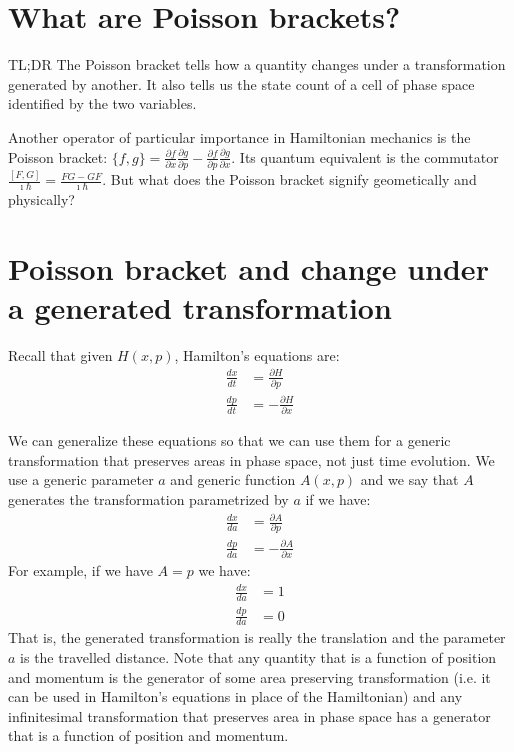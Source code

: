 \documentclass[aps,pra,10pt,floatfix,nofootinbib]{revtex4-1}
\theoremstyle{definition}
\begin{document}
\section{What are Poisson brackets?}

TL;DR The Poisson bracket tells how a quantity changes under a transformation generated by another. It also tells us the state count of a cell of phase space identified by the two variables.

Another operator of particular importance in Hamiltonian mechanics is the Poisson bracket: $\{f,g\}=\frac{\partial f}{\partial x}\frac{\partial g}{\partial p} - \frac{\partial f}{\partial p} \frac{\partial g}{\partial x}$. Its quantum equivalent is the commutator $\frac{[F, G]}{\imath \hbar} = \frac{FG - GF}{\imath \hbar}$. But what does the Poisson bracket signify geometically and physically?

\section{Poisson bracket and change under a generated transformation}

Recall that given $H(x,p)$, Hamilton's equations are:
\begin{equation}
\begin{aligned}
\frac{dx}{dt} &= \frac{\partial H}{\partial p}  \\
\frac{dp}{dt} &= - \frac{\partial H}{\partial x}
\end{aligned}
\label{Hamilton}
\end{equation}

We can generalize these equations so that we can use them for a generic transformation that preserves areas in phase space, not just time evolution. We use a generic parameter $a$ and generic function $A(x,p)$ and we say that $A$ generates the transformation parametrized by $a$ if we have:
\begin{equation}
\begin{aligned}
\frac{dx}{da} &= \frac{\partial A}{\partial p}  \\
\frac{dp}{da} &= - \frac{\partial A}{\partial x}
\end{aligned}
\label{GeneratedTransformation}
\end{equation}
For example, if we have $A=p$ we have:
\begin{equation}
\begin{aligned}
\frac{dx}{da} &= 1  \\
\frac{dp}{da} &= 0
\end{aligned}
\label{GeneratedTranslation}
\end{equation}
That is, the generated transformation is really the translation and the parameter $a$ is the travelled distance. Note that any quantity that is a function of position and momentum is the generator of some area preserving transformation (i.e. it can be used in Hamilton's equations in place of the Hamiltonian) and any infinitesimal transformation that preserves area in phase space has a generator that is a function of position and momentum.
\end{document}
